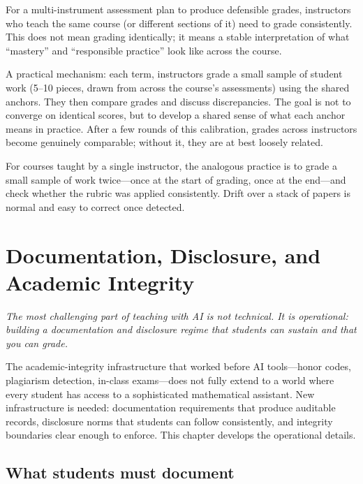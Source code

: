 \documentclass[11pt]{book}
\begin{document}
For a multi-instrument assessment plan to produce defensible grades, instructors who teach the same course (or different sections of it) need to grade consistently. This does not mean grading identically; it means a stable interpretation of what ``mastery'' and ``responsible practice'' look like across the course.

A practical mechanism: each term, instructors grade a small sample of student work (5--10 pieces, drawn from across the course's assessments) using the shared anchors. They then compare grades and discuss discrepancies. The goal is not to converge on identical scores, but to develop a shared sense of what each anchor means in practice. After a few rounds of this calibration, grades across instructors become genuinely comparable; without it, they are at best loosely related.

For courses taught by a single instructor, the analogous practice is to grade a small sample of work twice---once at the start of grading, once at the end---and check whether the rubric was applied consistently. Drift over a stack of papers is normal and easy to correct once detected.

\chapter{Documentation, Disclosure, and Academic Integrity}
\label{ch:documentation-integrity}

\noindent \emph{The most challenging part of teaching with AI is not technical. It is operational: building a documentation and disclosure regime that students can sustain and that you can grade.}

\medskip

The academic-integrity infrastructure that worked before AI tools---honor codes, plagiarism detection, in-class exams---does not fully extend to a world where every student has access to a sophisticated mathematical assistant. New infrastructure is needed: documentation requirements that produce auditable records, disclosure norms that students can follow consistently, and integrity boundaries clear enough to enforce. This chapter develops the operational details.

\section{What students must document}
\end{document}
